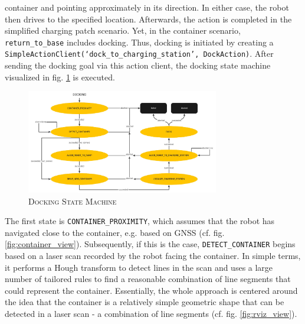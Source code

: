 \documentclass[english, master, utf8]{base/thesis_KBS}
\newcommand{\code}[1]{\colorbox{light-gray}{\texttt{#1}}}
\begin{document}
container and pointing approximately in its direction. In either case, the robot then drives to the specified location. Afterwards, the action is completed in the simplified charging
patch scenario. Yet, in the container scenario, \code{return\_to\_base} includes docking. Thus, docking is initiated by creating a
\code{SimpleActionClient(`dock\_to\_charging\_station', DockAction)}. After sending the docking goal via this action client, the docking state machine visualized in fig.
\ref{fig:docking_smach} is executed.
\begin{figure}[H]
    \centering
    \includegraphics[width=0.75\textwidth]{pics/docking_smach.jpg}
    \caption{\textsc{Docking State Machine}}
    \label{fig:docking_smach}
\end{figure}
The first state is \code{CONTAINER\_PROXIMITY}, which assumes that the robot has navigated close to the container, e.g. based on GNSS (cf. fig. \ref{fig:container_view}).
Subsequently, if this is the case, \code{DETECT\_CONTAINER} begins based on a laser scan recorded by the robot facing the container. In simple terms, it performs a Hough transform
to detect lines in the scan and uses a large number of tailored rules to find a reasonable combination of line segments that could represent the container. Essentially, the whole
approach is centered around the idea that the container is a relatively simple geometric shape that can be detected in a laser scan - a combination of line segments
(cf. fig. \ref{fig:rviz_view}).
\end{document}
